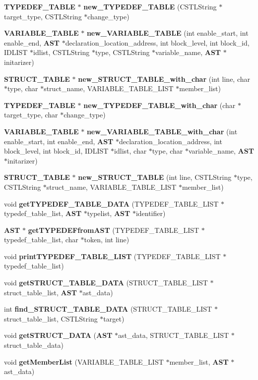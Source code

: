 \begin{DoxyCompactItemize}
\item 
{\bf TYPEDEF\_\-TABLE} $\ast$ {\bf new\_\-TYPEDEF\_\-TABLE} (CSTLString $\ast$target\_\-type, CSTLString $\ast$change\_\-type)
\item 
{\bf VARIABLE\_\-TABLE} $\ast$ {\bf new\_\-VARIABLE\_\-TABLE} (int enable\_\-start, int enable\_\-end, {\bf AST} $\ast$declaration\_\-location\_\-address, int block\_\-level, int block\_\-id, IDLIST $\ast$idlist, CSTLString $\ast$type, CSTLString $\ast$variable\_\-name, {\bf AST} $\ast$initarizer)
\item 
{\bf STRUCT\_\-TABLE} $\ast$ {\bf new\_\-STRUCT\_\-TABLE\_\-with\_\-char} (int line, char $\ast$type, char $\ast$struct\_\-name, VARIABLE\_\-TABLE\_\-LIST $\ast$member\_\-list)
\item 
{\bf TYPEDEF\_\-TABLE} $\ast$ {\bf new\_\-TYPEDEF\_\-TABLE\_\-with\_\-char} (char $\ast$target\_\-type, char $\ast$change\_\-type)
\item 
{\bf VARIABLE\_\-TABLE} $\ast$ {\bf new\_\-VARIABLE\_\-TABLE\_\-with\_\-char} (int enable\_\-start, int enable\_\-end, {\bf AST} $\ast$declaration\_\-location\_\-address, int block\_\-level, int block\_\-id, IDLIST $\ast$idlist, char $\ast$type, char $\ast$variable\_\-name, {\bf AST} $\ast$initarizer)
\item 
{\bf STRUCT\_\-TABLE} $\ast$ {\bf new\_\-STRUCT\_\-TABLE} (int line, CSTLString $\ast$type, CSTLString $\ast$struct\_\-name, VARIABLE\_\-TABLE\_\-LIST $\ast$member\_\-list)
\item 
void {\bf getTYPEDEF\_\-TABLE\_\-DATA} (TYPEDEF\_\-TABLE\_\-LIST $\ast$typedef\_\-table\_\-list, {\bf AST} $\ast$typelist, {\bf AST} $\ast$identifier)
\item 
{\bf AST} $\ast$ {\bf getTYPEDEFfromAST} (TYPEDEF\_\-TABLE\_\-LIST $\ast$typedef\_\-table\_\-list, char $\ast$token, int line)
\item 
void {\bf printTYPEDEF\_\-TABLE\_\-LIST} (TYPEDEF\_\-TABLE\_\-LIST $\ast$typedef\_\-table\_\-list)
\item 
void {\bf getSTRUCT\_\-TABLE\_\-DATA} (STRUCT\_\-TABLE\_\-LIST $\ast$struct\_\-table\_\-list, {\bf AST} $\ast$ast\_\-data)
\item 
int {\bf find\_\-STRUCT\_\-TABLE\_\-DATA} (STRUCT\_\-TABLE\_\-LIST $\ast$struct\_\-table\_\-list, CSTLString $\ast$target)
\item 
void {\bf getSTRUCT\_\-DATA} ({\bf AST} $\ast$ast\_\-data, STRUCT\_\-TABLE\_\-LIST $\ast$struct\_\-table\_\-data)
\item 
void {\bf getMemberList} (VARIABLE\_\-TABLE\_\-LIST $\ast$member\_\-list, {\bf AST} $\ast$ast\_\-data)

\end{DoxyCompactItemize}
